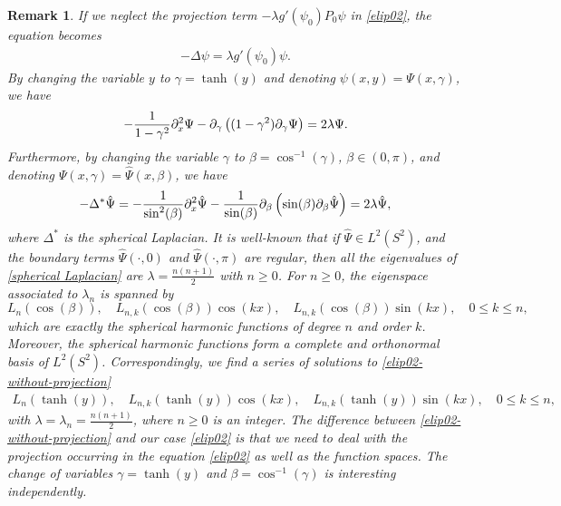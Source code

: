 \documentclass[1 [leqno, 11pt]{amsart}
\numberwithin{equation}{section}
\let\pa=\partial
\newtheorem{remark}[Theorem]{Remark}
\begin{document}
\begin{CJK*}{GBK}{song}
\begin{remark} If we neglect the projection term $-\lambda g'(\psi_0)P_0\psi$ in \eqref{elip02}, the equation becomes
 \begin{align}\label{elip02-without-projection}
-\Delta \psi = \lambda g'(\psi_0)\psi.
\end{align}
By changing the variable $y$ to $\gamma=\tanh(y)$ and denoting $\psi(x,y)=\Psi(x,\gamma)$, we have
\begin{align*}
-{1\over1-\gamma^2}\pa_x^2\Psi-\pa_\gamma\left((1-\gamma^2)\pa_\gamma\Psi\right)=2\lambda\Psi.
\end{align*}
Furthermore, by changing the variable $\gamma$ to $\beta=\cos^{-1}(\gamma)$, $\beta\in(0,\pi)$, and denoting $\Psi(x,\gamma)=\hat \Psi(x,\beta)$, we have
\begin{align}\label{spherical Laplacian}
-\Delta^*\hat\Psi=-{1\over\sin^2(\beta)}\pa_x^2\hat \Psi-{1\over \sin(\beta)}\pa_\beta\left(\sin(\beta)\pa_\beta\hat\Psi\right)=2\lambda\hat \Psi,
\end{align}
where $\Delta^*$ is the spherical Laplacian. It is well-known \cite{Courant-Hilbert53} that
 if $\hat\Psi\in L^2(S^2)$, and the boundary terms $\hat\Psi(\cdot,0)$ and $\hat\Psi(\cdot,\pi)$ are regular, then all the eigenvalues  of \eqref{spherical Laplacian} are $\lambda=\frac{n(n+1)}{2}$ with $n\geq0$.
For $n\geq0$, the eigenspace associated to $\lambda_n$ is  spanned by
$$ L_{n}(\cos(\beta)) , \quad  L_{n,k}(\cos(\beta))\cos(kx), \quad L_{n,k}(\cos(\beta))\sin(kx), \quad  0 \leq k\leq n,$$
which are exactly the spherical harmonic functions of degree $n$ and order $k$. Moreover, the  spherical harmonic functions
 form a complete and orthonormal basis of $L^2(S^2)$.
 Correspondingly, we find a series of solutions to \eqref{elip02-without-projection}
\begin{align*} L_{n}(\tanh(y)) , \quad  L_{n,k}(\tanh(y))\cos(kx), \quad L_{n,k}(\tanh(y))\sin(kx), \quad  0 \leq k\leq n,
\end{align*}
with $\lambda=\lambda_n =\frac{n(n+1)}{2}$, where $n\geq0$ is an integer.
 The difference between  \eqref{elip02-without-projection}  and our case  \eqref{elip02} is that we need to deal with the projection occurring in the equation \eqref{elip02}  as well as  the function spaces.
 The change of variables $\gamma=\tanh(y)$ and $\beta=\cos^{-1}(\gamma)$
 is interesting independently.
\end{remark}



\end{CJK*}
\end{document}
